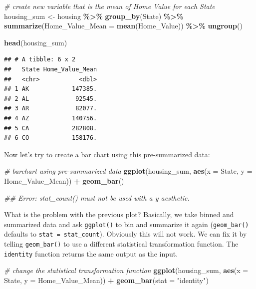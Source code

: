 \documentclass[
]{book}
\newenvironment{Shaded}{\begin{snugshade}}{\end{snugshade}}
\newcommand{\CommentTok}[1]{\textcolor[rgb]{0.56,0.35,0.01}{\textit{#1}}}
\newcommand{\DataTypeTok}[1]{\textcolor[rgb]{0.13,0.29,0.53}{#1}}
\newcommand{\KeywordTok}[1]{\textcolor[rgb]{0.13,0.29,0.53}{\textbf{#1}}}
\newcommand{\NormalTok}[1]{#1}
\newcommand{\OperatorTok}[1]{\textcolor[rgb]{0.81,0.36,0.00}{\textbf{#1}}}
\newcommand{\StringTok}[1]{\textcolor[rgb]{0.31,0.60,0.02}{#1}}
\begin{document}
\begin{Shaded}
\begin{Highlighting}[]
\CommentTok{\# create new variable that is the mean of \textquotesingle{}Home Value\textquotesingle{} for each \textquotesingle{}State\textquotesingle{}}
\NormalTok{housing\_sum \textless{}{-}}\StringTok{ }
\StringTok{  }\NormalTok{housing }\OperatorTok{\%\textgreater{}\%}
\StringTok{  }\KeywordTok{group\_by}\NormalTok{(State) }\OperatorTok{\%\textgreater{}\%}
\StringTok{  }\KeywordTok{summarize}\NormalTok{(}\DataTypeTok{Home\_Value\_Mean =} \KeywordTok{mean}\NormalTok{(Home\_Value)) }\OperatorTok{\%\textgreater{}\%}
\StringTok{  }\KeywordTok{ungroup}\NormalTok{()}

\KeywordTok{head}\NormalTok{(housing\_sum)}
\end{Highlighting}
\end{Shaded}

\begin{verbatim}
## # A tibble: 6 x 2
##   State Home_Value_Mean
##   <chr>           <dbl>
## 1 AK            147385.
## 2 AL             92545.
## 3 AR             82077.
## 4 AZ            140756.
## 5 CA            282808.
## 6 CO            158176.
\end{verbatim}

Now let's try to create a bar chart using this pre-summarized data:

\begin{Shaded}
\begin{Highlighting}[]
\CommentTok{\# barchart using pre{-}summarized data}
\KeywordTok{ggplot}\NormalTok{(housing\_sum, }\KeywordTok{aes}\NormalTok{(}\DataTypeTok{x =}\NormalTok{ State, }\DataTypeTok{y =}\NormalTok{ Home\_Value\_Mean)) }\OperatorTok{+}\StringTok{ }
\StringTok{  }\KeywordTok{geom\_bar}\NormalTok{()}

\CommentTok{\#\# Error: stat\_count() must not be used with a y aesthetic.  }
\end{Highlighting}
\end{Shaded}

What is the problem with the previous plot? Basically, we take binned and summarized data and ask \texttt{ggplot()} to bin and summarize it again (\texttt{geom\_bar()} defaults to \texttt{stat\ =\ stat\_count}). Obviously this will not work. We can fix it by telling \texttt{geom\_bar()} to use a different statistical transformation function. The \texttt{identity} function returns the same output as the input.

\begin{Shaded}
\begin{Highlighting}[]
\CommentTok{\# change the statistical transformation function}
\KeywordTok{ggplot}\NormalTok{(housing\_sum, }\KeywordTok{aes}\NormalTok{(}\DataTypeTok{x =}\NormalTok{ State, }\DataTypeTok{y =}\NormalTok{ Home\_Value\_Mean)) }\OperatorTok{+}\StringTok{ }
\StringTok{  }\KeywordTok{geom\_bar}\NormalTok{(}\DataTypeTok{stat =} \StringTok{"identity"}\NormalTok{)}
\end{Highlighting}
\end{Shaded}
\end{document}
